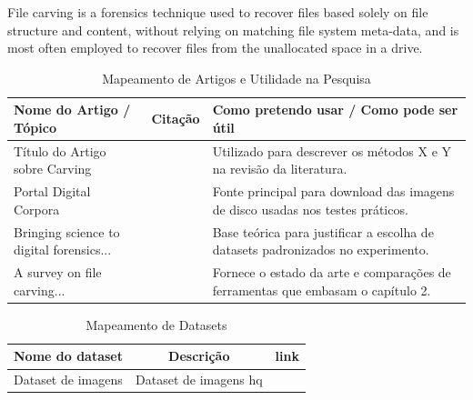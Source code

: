 \documentclass[12pt, a4paper]{report}
\begin{document}

\cite{10.1007/978-3-642-19513-6_12}


\cite{digitalcorpora}



\cite{GARFINKEL2009S2} 


\cite{alherbawi2016survey}





File carving is a forensics technique used to recover files based solely on file structure and content, without relying on matching file system meta-data, and is most often employed to recover files from the unallocated space in a drive.

\begin{table}[h]
    \caption{Mapeamento de Artigos e Utilidade na Pesquisa}
    \centering
    \begin{tabular}{p{5cm}|c|p{7cm}}
        \hline
        \textbf{Nome do Artigo / Tópico} & 
        \textbf{Citação} & 
        \textbf{Como pretendo usar / Como pode ser útil} \\
        \hline
        \hline
        Título do Artigo sobre Carving & \cite{10.1007/978-3-642-19513-6_12} & Utilizado para descrever os métodos X e Y na revisão da literatura. \\
        \hline
        Portal Digital Corpora & \cite{digitalcorpora} & Fonte principal para download das imagens de disco usadas nos testes práticos. \\
        \hline
        Bringing science to digital forensics... & \cite{GARFINKEL2009S2} & Base teórica para justificar a escolha de datasets padronizados no experimento. \\
        \hline
        A survey on file carving... & \cite{alherbawi2016survey} & Fornece o estado da arte e comparações de ferramentas que embasam o capítulo 2. \\
        \hline
    \end{tabular}
    \label{tbl:mapeamento_referencias}
\end{table}

\newpage
\begin{table}[h]
\caption{Mapeamento de Datasets}
\centering
    \begin{tabular}{p{5cm}|c|p{7cm}}

    \hline
    \textbf{Nome do dataset} & 
    \textbf{Descrição} & 
    \textbf{link} \\  \hline
    \hline
    Dataset de imagens & 
    Dataset de imagens hq & 
    \cite{pan2025pairhumanhighfidelityphotographicdataset}
                    

    

\end{tabular}
\label{tbl:mapeamento_datasets}
\end{table}




\end{document}
